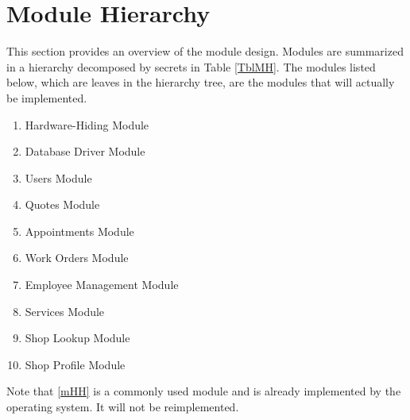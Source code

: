\documentclass[12pt, titlepage]{article}
\begin{document}
\section{Module Hierarchy} \label{SecMH}

This section provides an overview of the module design. Modules are summarized in a hierarchy
decomposed by secrets in Table \ref{TblMH}. The modules listed below, which are leaves in the
hierarchy tree, are the modules that will actually be implemented.

\begin{enumerate}[label=\textbf{M\arabic*:},ref=M\arabic*]
	\item \label{mHH} Hardware-Hiding Module
	\item \label{mDBDriver} Database Driver Module
	\item \label{mUsers} Users Module
	\item \label{mQuotes} Quotes Module
	\item \label{mAppointments} Appointments Module
	\item \label{mWorkOrders} Work Orders Module
	\item \label{mEmployeeManagement} Employee Management Module
	\item \label{mServices} Services Module
	\item \label{mShopLookup} Shop Lookup Module
	\item \label{mShopProfile} Shop Profile Module
\end{enumerate}

Note that \ref{mHH} is a commonly used module and is already implemented by the operating system.
It will not be reimplemented.
\end{document}
